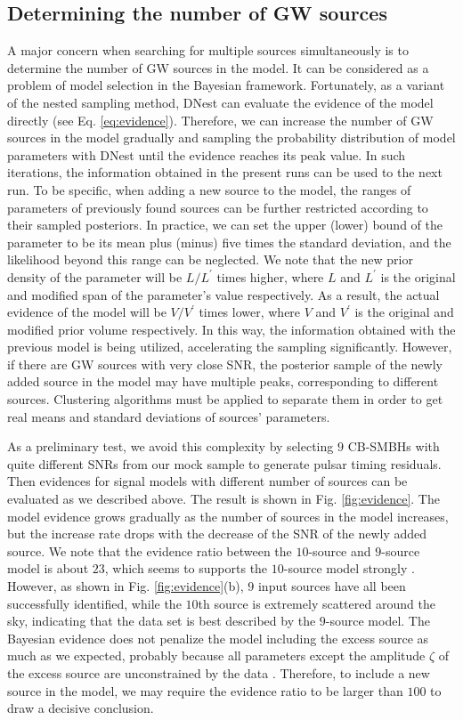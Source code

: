 \documentclass[times,tight]{aastex631}
\begin{document}
\subsection{Determining the number of GW sources}
A major concern when searching for multiple sources simultaneously is to determine the number of GW sources in the model.
It can be considered as a problem of model selection in the Bayesian framework.
Fortunately, as a variant of the nested sampling method, DNest can evaluate the evidence of the model directly (see Eq. \ref{eq:evidence}).
Therefore, we can increase the number of GW sources in the model gradually and sampling the probability distribution of model parameters with DNest until the evidence reaches its peak value.
In such iterations, the information obtained in the present runs can be used to the next run.
To be specific, when adding a new source to the model, the ranges of parameters of previously found sources can be further restricted according to their sampled posteriors.
In practice, we can set the upper (lower) bound of the parameter to be its mean plus (minus) five times the standard deviation, and the likelihood beyond this range can be neglected.
We note that the new prior density of the parameter will be $L/L^{\prime}$ times higher, where $L$ and $L^{\prime}$ is the original and modified span of the parameter's value respectively.
As a result, the actual evidence of the model will be $V/V^{\prime}$ times lower, where $V$ and $V^{\prime}$ is the original and modified prior volume respectively.
In this way, the information obtained with the previous model is being utilized, accelerating the sampling significantly.
However, if there are GW sources with very close SNR, the posterior sample of the newly added source in the model may have multiple peaks, corresponding to different sources.
Clustering algorithms must be applied to separate them in order to get real means and standard deviations of sources' parameters.

As a preliminary test, we avoid this complexity by selecting $9$ CB-SMBHs with quite different SNRs from our mock sample to generate pulsar timing residuals.
Then evidences for signal models with different number of sources can be evaluated as we described above.
The result is shown in Fig. \ref{fig:evidence}.
The model evidence grows gradually as the number of sources in the model increases, but the increase rate drops with the decrease of the SNR of the newly added source.
We note that the evidence ratio between the $10$-source and $9$-source model is about $23$, which seems to supports the $10$-source model strongly \citep{jeffreys1998}.
However, as shown in Fig. \ref{fig:evidence}(b), $9$ input sources have all been successfully identified, while the $10$th source is extremely scattered around the sky, indicating that the data set is best described by the $9$-source model.
The Bayesian evidence does not penalize the model including the excess source as much as we expected, probably because all parameters except the amplitude $\zeta$ of the excess source are unconstrained by the data \citep{taylor2021}.
Therefore, to include a new source in the model, we may require the evidence ratio to be larger than $100$ to draw a decisive conclusion.
\end{document}
